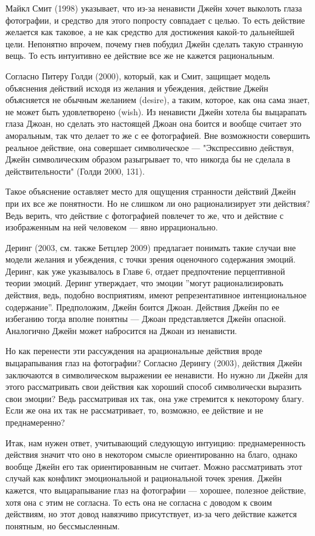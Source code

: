 \documentclass[11pt]{book}
\begin{document}
Майкл Смит (1998) указывает, что из-за ненависти Джейн хочет выколоть глаза фотографии, и средство для этого попросту совпадает с целью. То есть действие желается как таковое, а не как средство для достижения какой-то дальнейшей цели. Непонятно впрочем, почему гнев побудил Джейн сделать такую странную вещь. То есть интуитивно ее действие все же не кажется рациональным.

Согласно Питеру Голди (2000), который, как и Смит, защищает модель объяснения действий исходя из желания и убеждения, действие Джейн объясняется не обычным желанием (desire), а таким, которое, как она сама знает, не может быть удовлетворено (wish). Из ненависти Джейн хотела бы выцарапать глаза Джоан, но сделать это настоящей Джоан она боится и вообще считает это аморальным, так что делает то же с ее фотографией. Вне возможности совершить реальное действие, она совершает символическое --- "Экспрессивно действуя, Джейн символическим образом разыгрывает то, что никогда бы не сделала в действительности" (Голди 2000, 131).

Такое объяснение оставляет место для ощущения странности действий Джейн при их все же понятности. Но не слишком ли оно рационализирует эти действия? Ведь верить, что действие с фотографией повлечет то же, что и действие с изображенным на ней человеком --- явно иррационально.

Деринг (2003, см. также Бетцлер 2009) предлагает понимать такие случаи вне модели желания и убеждения, с точки зрения оценочного содержания эмоций. Деринг, как уже указывалось в Главе 6, отдает предпочтение перцептивной теории эмоций. Деринг утверждает, что эмоции ''могут рационализировать действия, ведь, подобно восприятиям, имеют репрезентативное интенциональное содержание''. Предположим, Джейн боится Джоан. Действия Джейн по ее избеганию тогда вполне понятны --- Джоан представляется Джейн опасной. Аналогично Джейн может набросится на Джоан из ненависти.

Но как перенести эти рассуждения на арациональные действия вроде выцарапывания глаз на фотографии? Согласно Дерингу (2003), действия Джейн заключаются в символическом выражении ее ненависти. Но нужно ли Джейн для этого рассматривать свои действия как хороший способ символически выразить свои эмоции? Ведь рассматривая их так, она уже стремится к некоторому благу. Если же она их так не рассматривает, то, возможно, ее действие и не преднамеренно?

Итак, нам нужен ответ, учитывающий следующую интуицию: преднамеренность действия значит что оно в некотором смысле ориентированно на благо, однако вообще Джейн его так ориентированным не считает. Можно рассматривать этот случай как конфликт эмоциональной и рациональной точек зрения. Джейн кажется, что выцарапывание глаз на фотографии --- хорошее, полезное действие, хотя она с этим не согласна. То есть она не согласна с доводом к своим действиям, но этот довод навязчиво присутствует, из-за чего действие кажется понятным, но бессмысленным.
\end{document}
